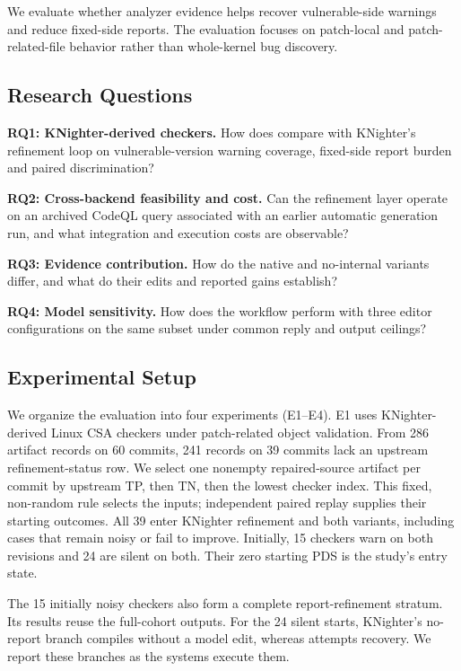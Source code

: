 We evaluate whether analyzer evidence helps \toolname recover vulnerable-side warnings and reduce fixed-side reports.
The evaluation focuses on patch-local and patch-related-file behavior rather than whole-kernel bug discovery.

\subsection{Research Questions}

\noindent\textbf{RQ1: KNighter-derived checkers.} How does \toolname compare with KNighter's refinement loop on vulnerable-version warning coverage, fixed-side report burden and paired discrimination?

\noindent\textbf{RQ2: Cross-backend feasibility and cost.} Can the refinement layer operate on an archived CodeQL query associated with an earlier automatic generation run, and what integration and execution costs are observable?

\noindent\textbf{RQ3: Evidence contribution.} How do the native and no-internal variants differ, and what do their edits and reported gains establish?

\noindent\textbf{RQ4: Model sensitivity.} How does the workflow perform with three editor configurations on the same subset under common reply and output ceilings?

\subsection{Experimental Setup}

We organize the evaluation into four experiments (E1--E4).
E1 uses KNighter-derived Linux CSA checkers under patch-related object validation.
From 286 artifact records on 60 commits, 241 records on 39 commits lack an upstream refinement-status row.
We select one nonempty repaired-source artifact per commit by upstream TP, then TN, then the lowest checker index.
This fixed, non-random rule selects the inputs; independent paired replay supplies their starting outcomes.
All 39 enter KNighter refinement and both \toolname variants, including cases that remain noisy or fail to improve.
Initially, 15 checkers warn on both revisions and 24 are silent on both.
Their zero starting PDS is the study's entry state.

The 15 initially noisy checkers also form a complete report-refinement stratum.
Its results reuse the full-cohort outputs.
For the 24 silent starts, KNighter's no-report branch compiles without a model edit, whereas \toolname attempts recovery.
We report these branches as the systems execute them.

